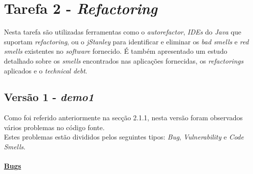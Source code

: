 \documentclass[a4paper]{report}
\begin{document}
\section{Tarefa 2 - \textit{Refactoring}}
Nesta tarefa são utilizadas ferramentas como o \textit{autorefactor}, \textit{IDEs} do \textit{Java} que suportam \textit{refactoring}, ou o \textit{jStanley} para identificar e eliminar os \textit{bad smells} e \textit{red smells} existentes no \textit{software} fornecido. É também apresentado um estudo detalhado sobre os \textit{smells} encontrados nas aplicações fornecidas, os \textit{refactorings} 
aplicados e o \textit{technical debt}.

\subsection{Versão 1 - \textit{demo1}}
Como foi referido anteriormente na secção 2.1.1, nesta versão foram observados vários problemas no código fonte.\\
Estes problemas estão divididos pelos seguintes tipos: \textit{Bug}, \textit{Vulnerability} e \textit{Code Smells}.\\\\
\underline{\textbf{Bugs}}
\end{document}
